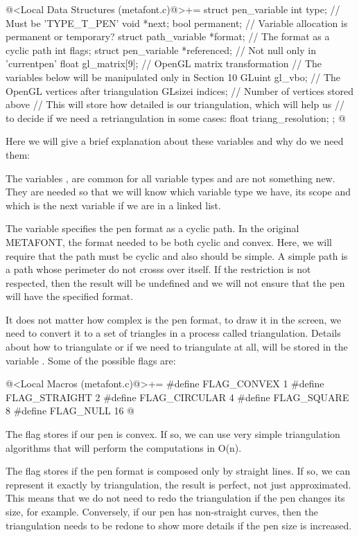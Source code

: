 \iniciocodigo
@<Local Data Structures (metafont.c)@>+=
struct pen_variable{
  int type; // Must be 'TYPE_T_PEN'
  void *next;
  bool permanent; // Variable allocation is permanent or temporary?
  struct path_variable *format; // The format as a cyclic path
  int flags;
  struct pen_variable *referenced; // Not null only in 'currentpen'
  float gl_matrix[9]; // OpenGL matrix transformation
  // The variables below will be manipulated only in Section 10
  GLuint gl_vbo; // The OpenGL vertices after triangulation
  GLsizei indices; // Number of vertices stored above
  // This will store how detailed is our triangulation, which will help us
  // to decide if we need a retriangulation in some cases:
  float triang_resolution;
};
@
\fimcodigo

Here we will give a brief explanation about these variables and why do
we need them:

The variables , 
are  common for all variable types and are not
something new. They are needed so that we will know which variable
type we have, its scope and which is the next variable if we are in a
linked list.

The variable  specifies the pen format as a cyclic
path. In the original METAFONT, the format needed to be both cyclic
and convex. Here, we will require that the path must be cyclic and
also should be simple. A simple path is a path whose perimeter do not
crosss over itself. If the restriction is not respected, then the
result will be undefined and we will not ensure that the pen will have
the specified format.

It does not matter how complex is the pen format, to draw it in the
screen, we need to convert it to a set of triangles in a process
called triangulation. Details about how to triangulate or if we need
to triangulate at all, will be stored in the
variable . Some of the possible flags are:

\iniciocodigo
@<Local Macros (metafont.c)@>+=
#define FLAG_CONVEX   1
#define FLAG_STRAIGHT 2
#define FLAG_CIRCULAR 4
#define FLAG_SQUARE   8
#define FLAG_NULL    16
@
\fimcodigo

The flag  stores if our pen is convex. If so,
we can use very simple triangulation algorithms that will perform the
computations in O(n).

The flag  stores if the pen format is
composed only by straight lines. If so, we can represent it exactly by
triangulation, the result is perfect, not just approximated. This
means that we do not need to redo the triangulation if the pen changes
its size, for example. Conversely, if our pen has non-straight curves,
then the triangulation needs to be redone to show more details if the
pen size is increased. 

